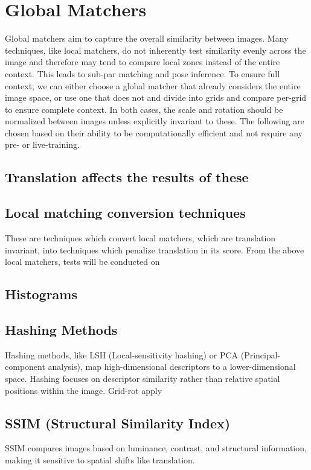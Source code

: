 \section*{Global Matchers}

Global matchers aim to capture the overall similarity between images. Many techniques, like local matchers, do not inherently test similarity evenly across the image and therefore may tend to compare local zones instead of the entire context. This leads to sub-par matching and pose inference. 
To ensure full context, we can either choose a global matcher that already considers the entire image space, or use one that does not and divide into grids and compare per-grid to ensure complete context. In both cases, the scale and rotation should be normalized between images unless explicitly invariant to these. 
The following are chosen based on their ability to be computationally efficient and not require any pre- or live-training.

\subsection*{Translation affects the results of these}

\subsection*{Local matching conversion techniques}
These are techniques which convert local matchers, which are translation invariant, into techniques which penalize translation in its score. From the above local matchers, tests will be conducted on 

\subsection*{Histograms}

\subsection*{Hashing Methods}  
Hashing methods, like LSH (Local-sensitivity hashing) or PCA (Principal-component analysis), map high-dimensional descriptors to a lower-dimensional space. Hashing focuses on descriptor similarity rather than relative spatial positions within the image. Grid-rot apply

\subsection*{SSIM (Structural Similarity Index)}  
SSIM compares images based on luminance, contrast, and structural information, making it sensitive to spatial shifts like translation. 


